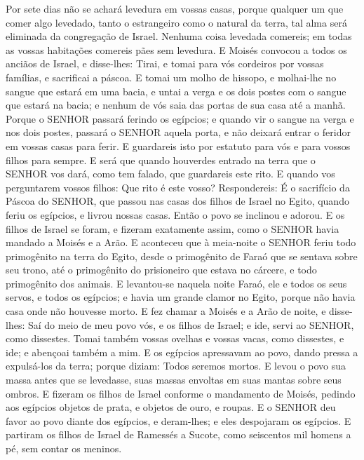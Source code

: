 {Por sete dias não se achará levedura em vossas casas, porque qualquer um que comer algo levedado, tanto o estrangeiro como o natural da terra, tal alma será eliminada da congregação de Israel.
Nenhuma coisa levedada comereis; em todas as vossas habitações comereis pães sem levedura.
E Moisés convocou a todos os anciãos de Israel, e disse-lhes: Tirai, e tomai para vós cordeiros por vossas famílias, e sacrificai a páscoa.
E tomai um molho de hissopo, e molhai-lhe no sangue que estará em uma bacia, e untai a verga e os dois postes com o sangue que estará na bacia; e nenhum de vós saia das portas de sua casa até a manhã.
Porque o SENHOR passará ferindo os egípcios; e quando vir o sangue na verga e nos dois postes, passará o SENHOR aquela porta, e não deixará entrar o feridor em vossas casas para ferir.
E guardareis isto por estatuto para vós e para vossos filhos para sempre.
E será que quando houverdes entrado na terra que o SENHOR vos dará, como tem falado, que guardareis este rito.
E quando vos perguntarem vossos filhos: Que rito é este vosso?
Respondereis: É o sacrifício da Páscoa do SENHOR, que passou nas casas dos filhos de Israel no Egito, quando feriu os egípcios, e livrou nossas casas. Então o povo se inclinou e adorou.
E os filhos de Israel se foram, e fizeram exatamente assim, como o SENHOR havia mandado a Moisés e a Arão.
E aconteceu que à meia-noite o SENHOR feriu todo primogênito na terra do Egito, desde o primogênito de Faraó que se sentava sobre seu trono, até o primogênito do prisioneiro que estava no cárcere, e todo primogênito dos animais.
E levantou-se naquela noite Faraó, ele e todos os seus servos, e todos os egípcios; e havia um grande clamor no Egito, porque não havia casa onde não houvesse morto.
E fez chamar a Moisés e a Arão de noite, e disse-lhes: Saí do meio de meu povo vós, e os filhos de Israel; e ide, servi ao SENHOR, como dissestes.
Tomai também vossas ovelhas e vossas vacas, como dissestes, e ide; e abençoai também a mim.
E os egípcios apressavam ao povo, dando pressa a expulsá-los da terra; porque diziam: Todos seremos mortos.
E levou o povo sua massa antes que se levedasse, suas massas envoltas em suas mantas sobre seus ombros.
E fizeram os filhos de Israel conforme o mandamento de Moisés, pedindo aos egípcios objetos de prata, e objetos de ouro, e roupas.
E o SENHOR deu favor ao povo diante dos egípcios, e deram-lhes; e eles despojaram os egípcios.
E partiram os filhos de Israel de Ramessés a Sucote, como seiscentos mil homens a pé, sem contar os meninos.
}
